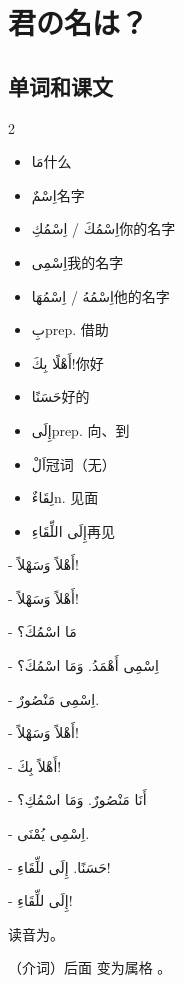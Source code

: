 \chapter{君の名は？}

\section{ 单词和课文}

\begin{multicols}{2}
    \begin{itemize}
        \item \ac{مَا}{什么}
        \item \ac{اِسْمٌ}{名字}
        \item \ac{اِسْمُكَ / اِسْمُكِ}{你的名字}
        \item \ac{اِسْمِى}{我的名字}
        \item \ac{اِسْمُهُ / اِسْمُهَا}{他的名字}
        \item \ac{بِ}{prep. 借助}
        \item \ac{أَهْلًا بِكَ!}{你好}
        \item \ac{حَسَنًا}{好的}
        \item \ac{إِلَى}{prep. 向、到}
        \item \ac{اَلْ}{冠词（无）}
        \item \ac{لِقَاءٌ}{n. 见面}
        \item \ac{إِلَى اللِّقَاءِ}{再见}
    \end{itemize}
\end{multicols}


\begin{Arabic}
    - أَهْلاً وَسَهْلاً! 

    - أَهْلاً وَسَهْلاً!

    - مَا اسْمُكَ؟

    - اِسْمِى أَهْمَدُ. وَمَا اسْمُكَ؟

    - اِسْمِى مَنْصُورٌ.

    - أَهْلاً وَسَهْلاً!

    - أَهْلاً بِكَ!

    - أَنَا مَنْصُورٌ. وَمَا اسْمُكِ؟

    - اِسْمِى يُمْنَى.

    - حَسَنًا. إِلَى للِّقَاءِ!

    - إِلَى للِّقَاءِ! 
\end{Arabic}

\begin{attention}
     读音为。

     （介词）后面  变为属格  。
\end{attention}

